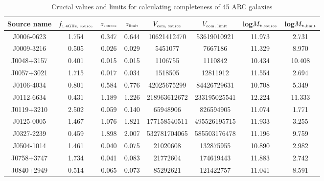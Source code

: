 \begin{table}    \caption{Crucial values and limits for calculating completeness of 45 ARC galaxies} \label{tab:ARC_45complval}
\begin{tabular}{cccccccc}
    \hline  %
    Source name & $f_{\mbox{\tiny{1.4GHz, source}}}$ &  $z_{\mbox{\tiny{source}}}$ & $z_{\mbox{\tiny{limit}}}$  & $V_{\mbox{\tiny{com, source}}}$ & $V_{\mbox{\tiny{com, limit}}}$ & log$M_{\star, \mbox{\tiny{source}}}$ & log$M_{\star, \mbox{\tiny{limit}}}$ \\
    \hline   %
    \hline   %
    J0006-0623 & 1.754 & 0.347 & 0.644  & 10621412470 & 53619010921  & 11.973 & 2.731  \\
    \addlinespace      
    J0009-3216  & 0.505 & 0.026 & 0.029  & 5451077 & 7667186  & 11.329 & 8.970  \\
    \addlinespace
    J0048+3157 & 0.401 & 0.015 & 0.015  & 1106755 & 1110842  & 10.434 & 10.408 \\
    \addlinespace
    J0057+3021 & 1.715 & 0.017 & 0.034  & 1518505 & 12811912  & 11.554 & 2.694 \\
    \addlinespace
    J0106-4034 & 0.801 & 0.584 & 0.776  & 42025675299 & 84426729631  & 10.708 & 5.349\\
    \addlinespace
    J0112-6634 & 0.431 & 1.189 & 1.226  & 218963612672 & 233195025541  & 12.224 & 11.333 \\
    \addlinespace
     J0119+3210 & 2.502 & 0.059 & 0.140  & 65948906 & 826594905  & 11.074 & 1.771 \\
    \addlinespace
     J0125-0005  & 1.467 & 1.076 & 1.821  & 177158540511 & 495526195715  & 11.933 & 3.255  \\
    \addlinespace
     J0327-2239  & 0.459 & 1.898 & 2.007  & 532781704065 & 585503176478  & 11.196 & 9.759 \\
    \addlinespace
     J0504-1014 & 1.461 & 0.040 & 0.075  & 21020608 & 132875955  & 10.890 & 2.982\\
    \addlinespace
     J0758+3747& 1.734 & 0.041 & 0.083  & 21772604 & 174619443  & 11.883 & 2.742 \\
    \addlinespace
     J0840+2949 & 0.514 & 0.065 & 0.073  & 85292621 & 121422757  & 11.041 & 8.591 \\

\end{tabular}
\end{table}
